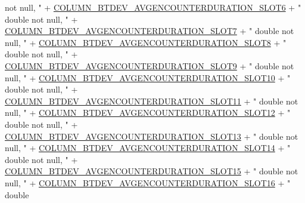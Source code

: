\begin{DoxyCode}
{       not null, "}
              + \hyperlink{classcom_1_1copelabs_1_1oiframework_1_1socialproximity_1_1_s_q_lite_helper_a4c44d6f65c62d53bd276c79208d38348}{COLUMN\_BTDEV\_AVGENCOUNTERDURATION\_SLOT6} + \textcolor{stringliteral}{" double
       not null, "}
              + \hyperlink{classcom_1_1copelabs_1_1oiframework_1_1socialproximity_1_1_s_q_lite_helper_ae6cfc9c5bc9e935cceaf7ca3e764b957}{COLUMN\_BTDEV\_AVGENCOUNTERDURATION\_SLOT7} + \textcolor{stringliteral}{" double
       not null, "}
              + \hyperlink{classcom_1_1copelabs_1_1oiframework_1_1socialproximity_1_1_s_q_lite_helper_afa1acefb9ac52993d28799345bf94d49}{COLUMN\_BTDEV\_AVGENCOUNTERDURATION\_SLOT8} + \textcolor{stringliteral}{" double
       not null, "}
              + \hyperlink{classcom_1_1copelabs_1_1oiframework_1_1socialproximity_1_1_s_q_lite_helper_a39c07bc84c3220997df50296c7d58ec0}{COLUMN\_BTDEV\_AVGENCOUNTERDURATION\_SLOT9} + \textcolor{stringliteral}{" double
       not null, "}
              + \hyperlink{classcom_1_1copelabs_1_1oiframework_1_1socialproximity_1_1_s_q_lite_helper_ab21157b336ae9f13c90f0589426c9d81}{COLUMN\_BTDEV\_AVGENCOUNTERDURATION\_SLOT10} + \textcolor{stringliteral}{" double
       not null, "}
              + \hyperlink{classcom_1_1copelabs_1_1oiframework_1_1socialproximity_1_1_s_q_lite_helper_aeb5a3e7fbf10b907bbe39cc8e693e486}{COLUMN\_BTDEV\_AVGENCOUNTERDURATION\_SLOT11} + \textcolor{stringliteral}{" double
       not null, "}
              + \hyperlink{classcom_1_1copelabs_1_1oiframework_1_1socialproximity_1_1_s_q_lite_helper_abc1b287d4e4071776d025ff203f0cb70}{COLUMN\_BTDEV\_AVGENCOUNTERDURATION\_SLOT12} + \textcolor{stringliteral}{" double
       not null, "}
              + \hyperlink{classcom_1_1copelabs_1_1oiframework_1_1socialproximity_1_1_s_q_lite_helper_a7e00e16a49501db8ef9d8345fb85444d}{COLUMN\_BTDEV\_AVGENCOUNTERDURATION\_SLOT13} + \textcolor{stringliteral}{" double
       not null, "}
              + \hyperlink{classcom_1_1copelabs_1_1oiframework_1_1socialproximity_1_1_s_q_lite_helper_a9e0ee8840e3194657b740ea34d5ac3c2}{COLUMN\_BTDEV\_AVGENCOUNTERDURATION\_SLOT14} + \textcolor{stringliteral}{" double
       not null, "}
              + \hyperlink{classcom_1_1copelabs_1_1oiframework_1_1socialproximity_1_1_s_q_lite_helper_a10ed1f74726e7c5904e0fb27b15867f9}{COLUMN\_BTDEV\_AVGENCOUNTERDURATION\_SLOT15} + \textcolor{stringliteral}{" double
       not null, "}
              + \hyperlink{classcom_1_1copelabs_1_1oiframework_1_1socialproximity_1_1_s_q_lite_helper_ab893303f476ecb25a5dc9c5eef2124df}{COLUMN\_BTDEV\_AVGENCOUNTERDURATION\_SLOT16} + \textcolor{stringliteral}{" double
}
\end{DoxyCode}
